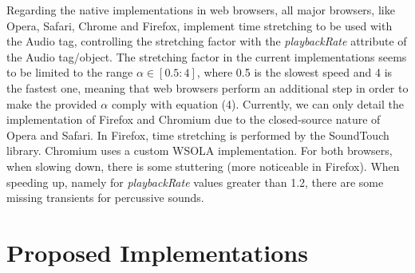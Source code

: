 \documentclass{sig-alternate}
\begin{document}
\begin{sloppypar}
Regarding the native implementations in web browsers, all major browsers, like Opera, Safari, Chrome and Firefox, implement time stretching to be used with the Audio tag, controlling the stretching factor with the \textit{playbackRate} attribute of the Audio tag/object. The stretching factor in the current implementations seems to be limited to the range $\alpha \in [0.5:4]$, where 0.5 is the slowest speed and 4 is the fastest one, meaning that web browsers perform an additional step in order to make the provided $\alpha$ comply with equation (4). Currently, we can only detail the implementation of Firefox and Chromium due to the closed-source nature of Opera and Safari. In Firefox, time stretching is performed by the SoundTouch library. Chromium uses a custom WSOLA implementation. For both browsers, when slowing down, there is some stuttering (more noticeable in Firefox). When speeding up, namely for \textit{playbackRate} values greater than 1.2, there are some missing transients for percussive sounds.
\end{sloppypar}

\section{Proposed Implementations}
\end{document}
